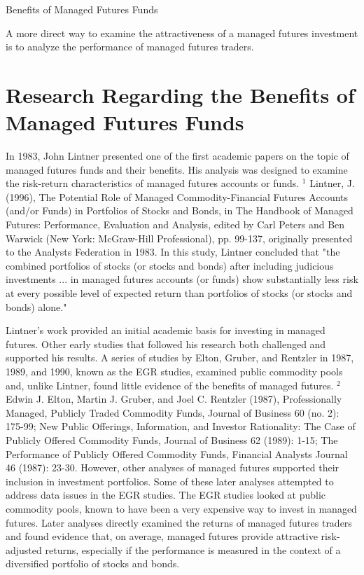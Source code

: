\documentclass[11pt]{article}
\begin{document}
Benefits of Managed Futures Funds

A more direct way to examine the attractiveness of a managed futures investment is to analyze the performance of managed futures traders.

\section*{Research Regarding the Benefits of Managed Futures Funds}
In 1983, John Lintner presented one of the first academic papers on the topic of managed futures funds and their benefits. His analysis was designed to examine the risk-return characteristics of managed futures accounts or funds. ${ }^{1}$ Lintner, J. (1996), The Potential Role of Managed Commodity-Financial Futures Accounts (and/or Funds) in Portfolios of Stocks and Bonds, in The Handbook of Managed Futures: Performance, Evaluation and Analysis, edited by Carl Peters and Ben Warwick (New York: McGraw-Hill Professional), pp. 99-137, originally presented to the Analysts Federation in 1983. In this study, Lintner concluded that "the combined portfolios of stocks (or stocks and bonds) after including judicious investments ... in managed futures accounts (or funds) show substantially less risk at every possible level of expected return than portfolios of stocks (or stocks and bonds) alone."

Lintner's work provided an initial academic basis for investing in managed futures. Other early studies that followed his research both challenged and supported his results. A series of studies by Elton, Gruber, and Rentzler in 1987, 1989, and 1990, known as the EGR studies, examined public commodity pools and, unlike Lintner, found little evidence of the benefits of managed futures. ${ }^{2}$ Edwin J. Elton, Martin J. Gruber, and Joel C. Rentzler (1987), Professionally Managed, Publicly Traded Commodity Funds, Journal of Business 60 (no. 2): 175-99; New Public Offerings, Information, and Investor Rationality: The Case of Publicly Offered Commodity Funds, Journal of Business 62 (1989): 1-15; The Performance of Publicly Offered Commodity Funds, Financial Analysts Journal 46 (1987): 23-30. However, other analyses of managed futures supported their inclusion in investment portfolios. Some of these later analyses attempted to address data issues in the EGR studies. The EGR studies looked at public commodity pools, known to have been a very expensive way to invest in managed futures. Later analyses directly examined the returns of managed futures traders and found evidence that, on average, managed futures provide attractive risk-adjusted returns, especially if the performance is measured in the context of a diversified portfolio of stocks and bonds.
\end{document}
